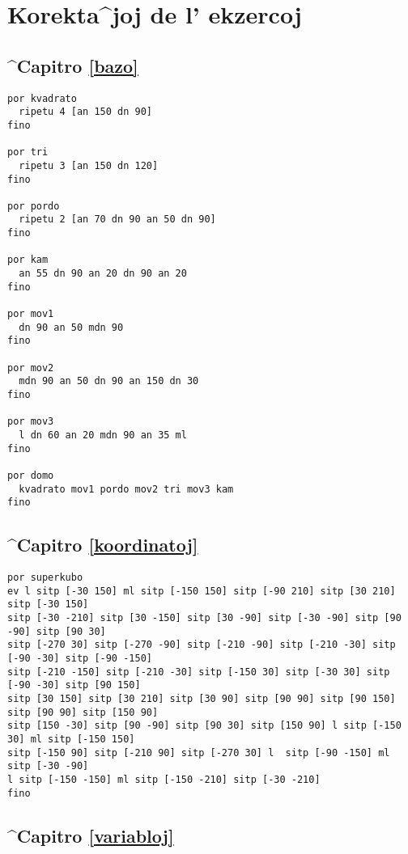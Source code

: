\chapter{Korekta^joj de l' ekzercoj}

\section{^Capitro \ref{bazo}}

\begin{verbatim}
por kvadrato
  ripetu 4 [an 150 dn 90]
fino

por tri
  ripetu 3 [an 150 dn 120]
fino

por pordo
  ripetu 2 [an 70 dn 90 an 50 dn 90]
fino

por kam
  an 55 dn 90 an 20 dn 90 an 20
fino

por mov1
  dn 90 an 50 mdn 90
fino

por mov2
  mdn 90 an 50 dn 90 an 150 dn 30
fino

por mov3
  l dn 60 an 20 mdn 90 an 35 ml
fino

por domo
  kvadrato mov1 pordo mov2 tri mov3 kam
fino
\end{verbatim}

\section{^Capitro \ref{koordinatoj}}

\begin{verbatim}
por superkubo
ev l sitp [-30 150] ml sitp [-150 150] sitp [-90 210] sitp [30 210] sitp [-30 150]
sitp [-30 -210] sitp [30 -150] sitp [30 -90] sitp [-30 -90] sitp [90 -90] sitp [90 30]  
sitp [-270 30] sitp [-270 -90] sitp [-210 -90] sitp [-210 -30] sitp [-90 -30] sitp [-90 -150]
sitp [-210 -150] sitp [-210 -30] sitp [-150 30] sitp [-30 30] sitp [-90 -30] sitp [90 150]
sitp [30 150] sitp [30 210] sitp [30 90] sitp [90 90] sitp [90 150] sitp [90 90] sitp [150 90]
sitp [150 -30] sitp [90 -90] sitp [90 30] sitp [150 90] l sitp [-150 30] ml sitp [-150 150] 
sitp [-150 90] sitp [-210 90] sitp [-270 30] l  sitp [-90 -150] ml sitp [-30 -90]
l sitp [-150 -150] ml sitp [-150 -210] sitp [-30 -210]
fino
\end{verbatim}

\section{^Capitro \ref{variabloj}}

